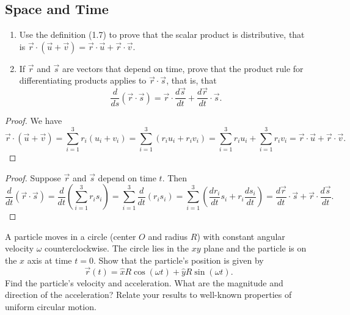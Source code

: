 \subsection{Space and Time}

\begin{tcolorbox}[title=Problem 8, breakable]
    \begin{enumerate}
        \item Use the definition (1.7) to prove that the scalar product 
        is distributive, that is $\vec{r} \cdot (\vec{u} + \vec{v}) = \vec{r} \cdot \vec{u} + \vec{r} \cdot \vec{v}$. 
        \item If $\vec{r}$ and $\vec{s}$ are vectors that depend on time, prove that the product rule for differentiating 
        products applies to $\vec{r} \cdot \vec{s}$, that is, that 
        \[\frac{d}{ds} (\vec{r} \cdot \vec{s}) = \vec{r} \cdot \frac{d \vec{s}}{dt} + \frac{d \vec{r}}{dt} \cdot \vec{s}.\]
    \end{enumerate}
\end{tcolorbox}

\begin{proof}
    We have 
    \[
        \vec{r} \cdot (\vec{u} + \vec{v}) 
        = \sum_{i = 1}^3 r_i (u_i + v_i) 
        = \sum_{i = 1}^3 (r_i u_i + r_i v_i) 
        = \sum_{i = 1}^3 r_i u_i + \sum_{i = 1}^3 r_i v_i 
        = \vec{r} \cdot \vec{u} + \vec{r} \cdot \vec{v}.
    \]
\end{proof}

\begin{proof}
    Suppose $\vec{r}$ and $\vec{s}$ depend on time $t$. Then
    \[
        \frac{d}{dt} (\vec{r} \cdot \vec{s}) 
        = \frac{d}{dt} \left( \sum_{i=1}^3 r_i s_i \right)
        = \sum_{i=1}^3 \frac{d}{dt}(r_i s_i)
        = \sum_{i=1}^3 \left( \frac{d r_i}{dt} s_i + r_i \frac{d s_i}{dt} \right)
        = \frac{d \vec{r}}{dt} \cdot \vec{s} + \vec{r} \cdot \frac{d \vec{s}}{dt}.
    \]
\end{proof}


\begin{tcolorbox}[title=Problem 10, breakable]
    A particle moves in a circle (center $O$ and radius $R$)
    with constant angular velocity $\omega$ counterclockwise.
    The circle lies in the $xy$ plane and the particle is on the $x$
    axis at time $t = 0$. Show that the particle's position is given by 
    \[\vec{r}(t) = \hat{x} R \cos(\omega t) + \hat{y} R \sin(\omega t).\]
    Find the particle's velocity and acceleration. 
    What are the magnitude and direction of the acceleration?
    Relate your results to well-known properties of uniform circular motion.
\end{tcolorbox}


